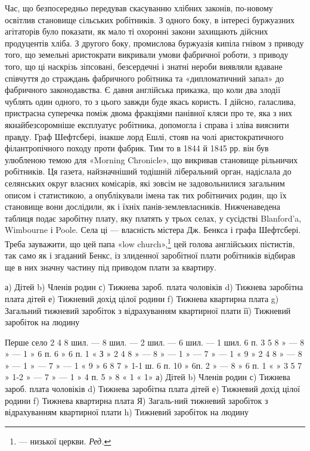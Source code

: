 Час, що безпосередньо передував скасуванню хлібних законів,
по-новому освітлив становище сільських робітників. З одного
боку, в інтересі буржуазних агітаторів було показати, як
мало ті охоронні закони захищають дійсних продуцентів хліба.
З другого боку, промислова буржуазія кипіла гнівом з приводу
того, що земельні аристократи викривали умови фабричної роботи,
з приводу того, що ці наскрізь зіпсовані, безсердечні і
знатні нероби виявляли вдаване співчуття до страждань фабричного
робітника та «дипломатичний запал» до фабричного законодавства.
Є давня англійська приказка, що коли два злодії
чублять один одного, то з цього завжди буде якась користь.
І дійсно, галаслива, пристрасна суперечка поміж двома фракціями
панівної кляси про те, яка з них якнайбезсоромніше експлуатує
робітника, допомогла і справа і зліва вияснити правду. Граф
Шефтсбері, інакше лорд Ешлі, стояв на чолі аристократичного
філантропічного походу проти фабрик. Тим то в 1844 й
1845 рр. він був улюбленою темою для «Morning Chronicle», що
викривав становище рільничих робітників. Ця газета, найзначніший
тодішній ліберальний орган, надіслала до селянських округ
власних комісарів, які зовсім не задовольнилися загальним
описом і статистикою, а опублікували імена так тих робітничих
родин, що їх становище вони дослідили, як і їхніх панів-землевласників.
Нижченаведена таблиця подає заробітну плату,
яку платять у трьох селах, у сусідстві Blanford’a, Wimbourne
і Poole. Села ці — власність містера Дж. Бенкса і графа Шефтсбері.
Треба зауважити, що цей папа «low church»,\footnote*{
— низької церкви. \emph{Ред.}
} цей голова англійських
пієтистів, так само як і згаданий Бенкс, із злиденної
заробітної плати робітників відбирав ще в них значну частину
під приводом плати за квартиру.

а) Дітей    b) Членів родин    с) Тижнева зароб. плата чоловіків    d) Тижнева заробітна плата дітей
   е) Тижневий дохід цілої родини    f) Тижнева квартирна плата
g) Загальний тижневий заробіток з відрахуванням квартирної плати    її) Тижневий заробіток на людину

Перше село
2    4    8 шил. —                8 шил. —     2 шил. —       6 шил.   —     1 шил. 6      п.
3    5    8    »     —                 8   »      —     1    »      6 п.   6    »       6 п.  1   «
    З  »
2    4    8    »     —                 8   »      —     1    »      —      7    »       —      1   «
     9       »
2    4    8    »     —                 8   »      —     1    »      —      7    »       —      1   «
     9       »
6    8    7    »    1-1 ш. 6 п.  10 »      6п.   2    »     —       8    »       6 п.   1  «
 »
3    5    7    »    1-2  » —       7   »      —     1    »      4 п.   5    »       8 «     1  «
 1»
а) Дітей  b) Членів родин    с) Тижнева зароб. плата чоловіків    d) Тижнева заробітна плата дітей
 е) Тижневий дохід цілої родини    f) Тижнева квартирна плата    Я) Загаль-ний тижневий заробіток з
відрахуванням квартирної плати    h) Тижневий заробіток на людину

